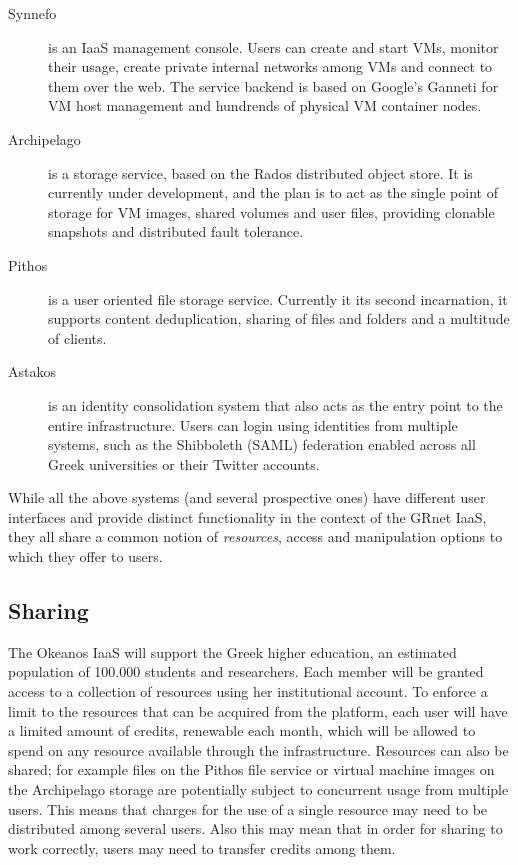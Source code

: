 \documentclass[preprint,10pt]{sigplanconf}
\begin{document}
\begin{description}

    \item[Synnefo] is an IaaS management console. Users can create and start
        VMs, monitor their usage, create private internal networks among VMs
        and connect to them over the web. The service backend is based on
        Google's Ganneti for VM host management and hundrends of physical
        VM container nodes.

    \item[Archipelago] is a storage service, based on the Rados
        distributed object store. It is currently under development, and the
        plan is to act as the single point of storage for VM images, shared
        volumes and user files, providing clonable snapshots and distributed
        fault tolerance.
    
    \item[Pithos] is a user oriented file storage service. Currently it its
        second incarnation, it supports content deduplication, sharing of files
        and folders and a multitude of clients.

    \item[Astakos] is an identity consolidation system that also acts as the
        entry point to the entire infrastructure. Users can login using 
        identities from multiple systems, such as the Shibboleth (SAML) 
        federation enabled across all Greek universities or their Twitter 
        accounts.

\end{description}

While all the above systems (and several prospective ones) have different 
user interfaces and provide distinct functionality in the context of
the GRnet IaaS, they all share a common notion of \emph{resources}, access
and manipulation options to which they offer to users. 

\subsection{Sharing}

The Okeanos IaaS will support the Greek higher education, an estimated
population of 100.000 students and researchers. Each member will be granted
access to a collection of resources using her institutional account. To enforce
a limit to the resources that can be acquired from the platform, each user will
have a limited amount of credits, renewable each month, which will be allowed
to spend on any resource available through the infrastructure. Resources can
also be shared; for example files on the Pithos file service or virtual machine
images on the Archipelago storage are potentially subject to concurrent usage from 
multiple users. This means that charges for the use of a single resource
may need to be distributed among several users. Also this may mean that in order
for sharing to work correctly, users may need to transfer credits among them.
\end{document}
